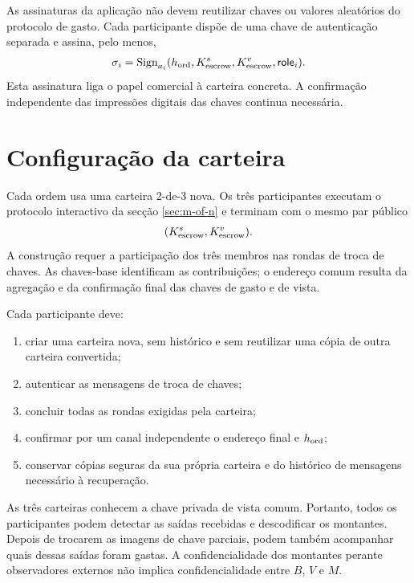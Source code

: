 As assinaturas da aplicação não devem reutilizar chaves ou valores aleatórios
do protocolo de gasto. Cada participante dispõe de uma chave de autenticação
separada e assina, pelo menos,
\begin{align}
 \sigma_i
 =\operatorname{Sign}_{a_i}(
 h_{\rm ord},
 K_{\rm escrow}^s,
 K_{\rm escrow}^v,
 \mathsf{role}_i).
 \label{eq:escrow-role-binding}
\end{align}
Esta assinatura liga o papel comercial à carteira concreta. A confirmação
independente das impressões digitais das chaves continua necessária.

\section{Configuração da carteira}
\label{sec:escrow-wallet-setup}

Cada ordem usa uma carteira 2-de-3 nova. Os três participantes executam o
protocolo interactivo da secção \ref{sec:m-of-n} e terminam com o mesmo par
público
\begin{align}
 (K_{\rm escrow}^s,K_{\rm escrow}^v).
\end{align}
A construção requer a participação dos três membros nas rondas de troca de
chaves. As chaves-base identificam as contribuições; o endereço comum resulta
da agregação e da confirmação final das chaves de gasto e de vista.

Cada participante deve:

\begin{enumerate}
 \item criar uma carteira nova, sem histórico e sem reutilizar uma cópia de
 outra carteira convertida;

 \item autenticar as mensagens de troca de chaves;

 \item concluir todas as rondas exigidas pela carteira;

 \item confirmar por um canal independente o endereço final e
 \(h_{\rm ord}\);

 \item conservar cópias seguras da sua própria carteira e do histórico de
 mensagens necessário à recuperação.
\end{enumerate}

As três carteiras conhecem a chave privada de vista comum. Portanto, todos os
participantes podem detectar as saídas recebidas e descodificar os montantes.
Depois de trocarem as imagens de chave parciais, podem também acompanhar quais
dessas saídas foram gastas. A confidencialidade dos montantes perante
observadores externos não implica confidencialidade entre \(B\), \(V\) e \(M\).

